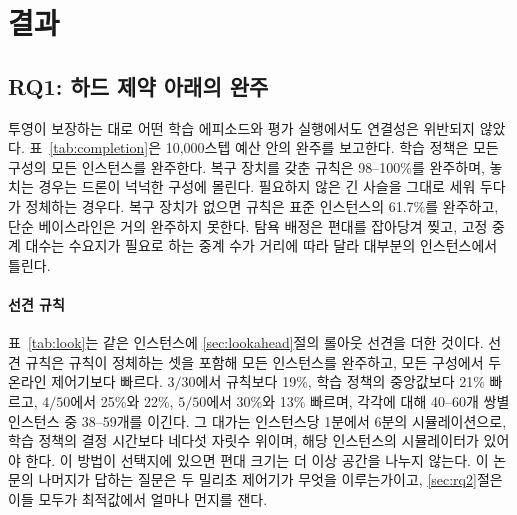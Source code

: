 \documentclass[final,5p,times,twocolumn]{elsarticle}
\begin{document}
\section{결과}
\label{sec:results}

\subsection{RQ1: 하드 제약 아래의 완주}
\label{sec:rq1}

투영이 보장하는 대로 어떤 학습 에피소드와 평가 실행에서도 연결성은 위반되지 않았다.
표~\ref{tab:completion}은 10{,}000스텝 예산 안의 완주를 보고한다. 학습 정책은 모든 구성의 모든
인스턴스를 완주한다. 복구 장치를 갖춘 규칙은 98--100\%를 완주하며, 놓치는 경우는 드론이
넉넉한 구성에 몰린다. 필요하지 않은 긴 사슬을 그대로 세워 두다가 정체하는 경우다. 복구 장치가
없으면 규칙은 표준 인스턴스의 61.7\%를 완주하고, 단순 베이스라인은 거의 완주하지 못한다. 탐욕
배정은 편대를 잡아당겨 찢고, 고정 중계 대수는 수요지가 필요로 하는 중계 수가 거리에 따라 달라
대부분의 인스턴스에서 틀린다.

\paragraph{선견 규칙}
표~\ref{tab:look}는 같은 인스턴스에 \ref{sec:lookahead}절의 롤아웃 선견을 더한 것이다. 선견 규칙은
규칙이 정체하는 셋을 포함해 모든 인스턴스를 완주하고, 모든 구성에서 두 온라인 제어기보다 빠르다.
$3/30$에서 규칙보다 19\%, 학습 정책의 중앙값보다 21\% 빠르고, $4/50$에서 25\%와 22\%, $5/50$에서
30\%와 13\% 빠르며, 각각에 대해 40--60개 쌍별 인스턴스 중 38--59개를 이긴다. 그 대가는 인스턴스당
1분에서 6분의 시뮬레이션으로, 학습 정책의 결정 시간보다 네다섯 자릿수 위이며, 해당 인스턴스의
시뮬레이터가 있어야 한다. 이 방법이 선택지에 있으면 편대 크기는 더 이상 공간을 나누지 않는다. 이
논문의 나머지가 답하는 질문은 두 밀리초 제어기가 무엇을 이루는가이고, \ref{sec:rq2}절은 이들 모두가
최적값에서 얼마나 먼지를 잰다.

\begin{table}[t]
\centering
\caption{세 주요 구성의 연속 공간에서 규칙, 선견 규칙, 학습 정책(쌍별 실행의 인스턴스별 중앙값)의
평균 makespan과 완주한 인스턴스 또는 실행 수, 셋 모두 완주한 인스턴스에서 선견 규칙의 각각에 대한
승--패와 윌콕슨 $p$, 그리고 선견 규칙의 인스턴스당 평균 시뮬레이션 시간.}
\label{tab:look}
\scriptsize
\setlength{\tabcolsep}{0.9pt}

\end{table}
\end{document}
